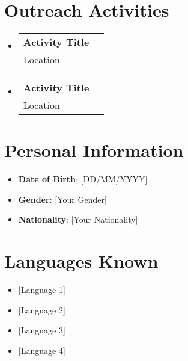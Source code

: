 \documentclass[A4,11pt]{article}
\makeatletter
\newcommand{\CVItem}[1]{
	\item\small{
		{#1 \vspace{-2pt}}
	}
}
\newcommand{\CVSubheading}[4]{
	\vspace{-2pt}\item
	\begin{tabular*}{0.97\textwidth}[t]{l@{\extracolsep{\fill}}r}
		\textbf{#1} & #2 \\
		\small#3 & \small #4 \\
	\end{tabular*}\vspace{-7pt}
}
\newcommand{\CVSubItem}[1]{\CVItem{#1}\vspace{-4pt}}
\newcommand{\CVSubHeadingListStart}{\begin{itemize}[leftmargin=0.5cm, label={}]}
\newcommand{\CVSubHeadingListEnd}{\end{itemize}}
\makeatother
\begin{document}
		\section{Outreach Activities}
		\CVSubHeadingListStart
		\CVSubheading
		{Activity Title}{}
		{Location}{}
		\CVSubheading
		{Activity Title}{}
		{Location}{}
		\CVSubHeadingListEnd
		
		\section{Personal Information}

		\CVSubHeadingListStart
		\CVSubItem{\normalsize \textbf{Date of Birth}: [DD/MM/YYYY]}
		\CVSubItem{\normalsize \textbf{Gender}: [Your Gender]}
		\CVSubItem{\normalsize \textbf{Nationality}: [Your Nationality]}
		\CVSubHeadingListEnd
		
		\section{Languages Known}
		
		\CVSubHeadingListStart
		\CVSubItem{\normalsize [Language 1]}
		\CVSubItem{\normalsize [Language 2]}
		\CVSubItem{\normalsize [Language 3]}
		\CVSubItem{\normalsize [Language 4]}
		\CVSubHeadingListEnd
		
		
		
	
\end{document}
